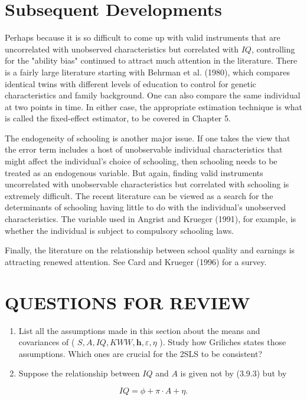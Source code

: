 \documentclass[10pt]{article}
\begin{document}
\section*{Subsequent Developments}
Perhaps because it is so difficult to come up with valid instruments that are uncorrelated with unobserved characteristics but correlated with $I Q$, controlling for the "ability bias" continued to attract much attention in the literature. There is a fairly large literature starting with Behrman et al. (1980), which compares identical twins with different levels of education to control for genetic characteristics and family background. One can also compare the same individual at two points in time. In either case, the appropriate estimation technique is what is called the fixed-effect estimator, to be covered in Chapter 5.

The endogeneity of schooling is another major issue. If one takes the view that the error term includes a host of unobservable individual characteristics that might affect the individual's choice of schooling, then schooling needs to be treated as an endogenous variable. But again, finding valid instruments uncorrelated with unobservable characteristics but correlated with schooling is extremely difficult. The recent literature can be viewed as a search for the determinants of schooling having little to do with the individual's unobserved characteristics. The variable used in Angrist and Krueger (1991), for example, is whether the individual is subject to compulsory schooling laws.

Finally, the literature on the relationship between school quality and earnings is attracting renewed attention. See Card and Krueger (1996) for a survey.

\section*{QUESTIONS FOR REVIEW}
\begin{enumerate}
  \item List all the assumptions made in this section about the means and covariances of ( $S, A, I Q, K W W, \mathbf{h}, \varepsilon, \eta$ ). Study how Griliches states those assumptions. Which ones are crucial for the 2SLS to be consistent?
  \item Suppose the relationship between $I Q$ and $A$ is given not by (3.9.3) but by
\end{enumerate}

$$
I Q=\phi+\pi \cdot A+\eta .
$$
\end{document}
